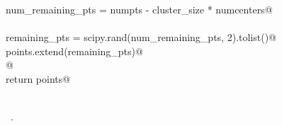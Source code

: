 \documentclass[11.5pt]{report}
\begin{document}
\begin{flushleft}
\begin{list}{}{}
\mbox{}\verb@    num_remaining_pts = numpts - cluster_size * numcenters@\\
\mbox{}\verb@@\\
\mbox{}\verb@    remaining_pts = scipy.rand(num_remaining_pts, 2).tolist()@\\
\mbox{}\verb@    points.extend(remaining_pts)@\\
\mbox{}\verb@    @\\
\mbox{}\verb@    return points@\\
\mbox{}\verb@@\\
\mbox{}\verb@@{\NWsep}
\end{list}
\vspace{-1.5ex}
\footnotesize
\begin{list}{}{\setlength{\itemsep}{-\parsep}\setlength{\itemindent}{-\leftmargin}}
\item \NWtxtFileDefBy\ .

\item{}
\end{list}
\vspace{4ex}
\end{flushleft}
 
\end{document}
